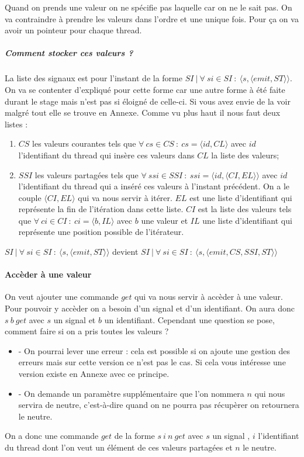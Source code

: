 \documentclass[10pt,a4paper]{article}
\begin{document}
					Quand on prends une valeur on ne spécifie pas laquelle car on ne le sait pas. On va contraindre à prendre les valeurs dans l'ordre et une unique fois. Pour ça on va avoir un pointeur pour chaque thread. 
					
					\subparagraph{Comment stocker ces valeurs ?} 
					La liste des signaux est pour l'instant de la forme $SI~|~\forall~si \in SI~:~\langle s,\langle emit,ST \rangle\rangle$. On va se contenter d'expliqué pour cette forme car une autre forme à été faite durant le stage mais n'est pas si éloigné de celle-ci. Si vous avez envie de la voir malgré tout elle se trouve en Annexe. Comme vu plus haut il nous faut deux listes : 
					\smallbreak
					\begin{enumerate}
						\item $CS$ les valeurs courantes tels que $\forall~cs \in CS~:~cs = \langle id , CL \rangle$ avec $id$ l'identifiant du thread qui insère ces valeurs dans $CL$ la liste des valeurs;
						\item $SSI$ les valeurs partagées tels que $\forall~ssi \in SSI~:~ssi = \langle id,\langle CI,EL\rangle\rangle$ avec $id$ l'identifiant du thread qui a inséré ces valeurs à l'instant précédent. On a le couple $\langle CI,EL\rangle$ qui va nous servir à itérer. $EL$ est une liste d'identifiant qui représente la fin de l'itération dans cette liste. $CI$ est la liste des valeurs tels que $\forall~ci \in CI~:~ci = \langle b,IL\rangle$ avec $b$ une valeur et $IL$ une liste d'identifiant qui représente une position possible de l'itérateur.
					\end{enumerate}
					\medbreak
					
					$SI~|~\forall~si \in SI~:~\langle s,\langle emit,ST \rangle\rangle$ devient $SI~|~\forall~si \in SI~:~\langle s,\langle emit,CS,SSI,ST \rangle\rangle$
					\bigbreak
					
					
				\paragraph{Accèder à une valeur}
					
					On veut ajouter une commande $get$ qui va nous servir à accèder à une valeur. Pour pouvoir y accèder on a besoin d'un signal et d'un identifiant. On aura donc $s~b~get$ avec $s$ un signal et $b$ un identifiant. Cependant une question se pose, comment faire si on a pris toutes les valeurs ? 
					\smallbreak
					\begin{itemize}
						\item[] - On pourrai lever une erreur : cela est possible si on ajoute une gestion des erreurs mais sur cette version ce n'est pas le cas. Si cela vous intéresse une version existe en Annexe avec ce principe.
						\item[] - On demande un paramètre supplémentaire que l'on nommera $n$ qui nous servira de neutre, c'est-à-dire quand on ne pourra pas récupèrer on retournera le neutre.
					\end{itemize} 
					\smallbreak
					On a donc une commande $get$ de la forme $s~i~n~get$ avec $s$ un signal , $i$ l'identifiant du thread dont l'on veut un élément de ces valeurs partagées et $n$ le neutre. 
					\bigbreak
					
\end{document}
